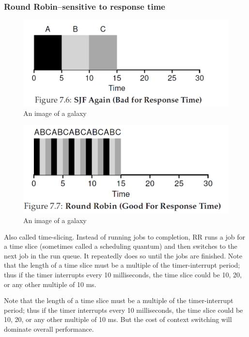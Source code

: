 \documentclass{article}
\begin{document}
\subsubsection{Round Robin--sensitive to response time}
\begin{figure}[H]
    \centering
    \includegraphics[width=13cm] {fig7.6.png}
    \caption{An image of a galaxy}
    \label{fig:galaxy}
\end{figure}
\begin{figure}[H]
    \centering
    \includegraphics[width=13cm] {fig7.7.png}
    \caption{An image of a galaxy}
    \label{fig:galaxy}
\end{figure}
{\color{red}Also called time-slicing. Instead of running jobs to completion, RR runs a job for a
time slice (sometimes called a scheduling quantum) and then switches to the next job in the run queue. It repeatedly does so until the jobs are
finished.} Note that
the length of a time slice must be a multiple of the timer-interrupt period;
thus if the timer interrupts every 10 milliseconds, the time slice could be
10, 20, or any other multiple of 10 ms.

{\color{red} Note that
the length of a time slice must be a multiple of the timer-interrupt period;
thus if the timer interrupts every 10 milliseconds, the time slice could be
10, 20, or any other multiple of 10 ms. But the
cost of context switching will dominate overall performance.}
\end{document}
